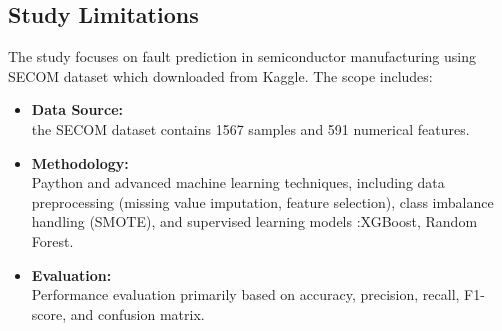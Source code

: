 \documentclass[12pt,oneside]{article}
\begin{document}
\subsection{Study Limitations}
The study focuses on fault prediction in semiconductor manufacturing using SECOM dataset which downloaded from Kaggle. The scope includes:\
\begin{itemize}
    \item \textbf{\textcolor[HTML]{8B0000}{Data Source:}} \\
   the SECOM dataset contains 1567 samples and 591 numerical features.
    
    \item \textbf{\textcolor[HTML]{8B0000}{Methodology:}} \\
    Paython and advanced machine learning techniques, including data preprocessing (missing value imputation, feature selection), class imbalance handling (SMOTE), and supervised learning models :XGBoost, Random Forest.
    
    \item \textbf{\textcolor[HTML]{8B0000}{Evaluation:}} \\
    Performance evaluation primarily based on accuracy, precision, recall, F1-score, and confusion matrix.
\end{itemize}
\end{document}
